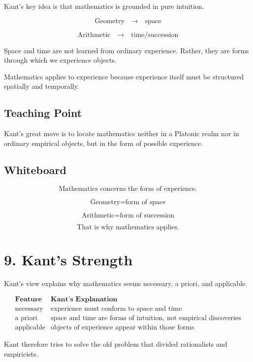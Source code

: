 \documentclass[11pt]{article}
\begin{document}
Kant's key idea is that mathematics is grounded in pure intuition.

\[
\text{Geometry}
\quad \rightarrow \quad
\text{space}
\]

\[
\text{Arithmetic}
\quad \rightarrow \quad
\text{time/succession}
\]

Space and time are not learned from ordinary experience. Rather, they are forms through
which we experience objects.

Mathematics applies to experience because experience itself must be structured spatially
and temporally.

\subsection*{Teaching Point}

Kant's great move is to locate mathematics neither in a Platonic realm nor in ordinary
empirical objects, but in the form of possible experience.

\subsection*{Whiteboard}

\[
\text{Mathematics concerns the form of experience.}
\]

\[
\text{Geometry} = \text{form of space}
\]

\[
\text{Arithmetic} = \text{form of succession}
\]

\[
\text{That is why mathematics applies.}
\]

\section*{9. Kant's Strength}

Kant's view explains why mathematics seems necessary, a priori, and applicable.

\[
\begin{array}{c|c}
\textbf{Feature} & \textbf{Kant's Explanation} \\
\hline
\text{necessary} &
\text{experience must conform to space and time} \\
\text{a priori} &
\text{space and time are forms of intuition, not empirical discoveries} \\
\text{applicable} &
\text{objects of experience appear within those forms}
\end{array}
\]

Kant therefore tries to solve the old problem that divided rationalists and empiricists.
\end{document}
